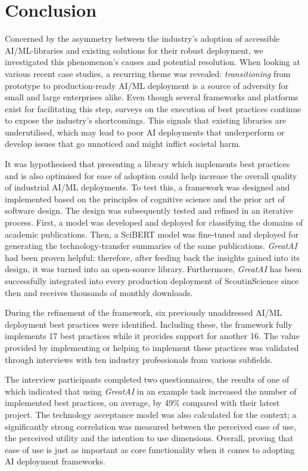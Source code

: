 \chapter{Conclusion} \label{chapter:conclusion}

Concerned by the asymmetry between the industry's adoption of accessible AI/ML-libraries and existing solutions for their robust deployment, we investigated this phenomenon's causes and potential resolution. When looking at various recent case studies, a recurring theme was revealed: \textit{transitioning} from prototype to production-ready AI/ML deployment is a source of adversity for small and large enterprises alike. Even though several frameworks and platforms exist for facilitating this step, surveys on the execution of best practices continue to expose the industry's shortcomings. This signals that existing libraries are underutilised, which may lead to poor AI deployments that underperform or develop issues that go unnoticed and might inflict societal harm.

It was hypothesised that presenting a library which implements best practices and is also optimised for ease of adoption could help increase the overall quality of industrial AI/ML deployments. To test this, a framework was designed and implemented based on the principles of cognitive science and the prior art of software design. The design was subsequently tested and refined in an iterative process. First, a model was developed and deployed for classifying the domains of academic publications. Then, a SciBERT model was fine-tuned and deployed for generating the technology-transfer summaries of the same publications. \textit{GreatAI} had been proven helpful; therefore, after feeding back the insights gained into its design, it was turned into an open-source library. Furthermore, \textit{GreatAI} has been successfully integrated into every production deployment of ScoutinScience since then and receives thousands of monthly downloads.

During the refinement of the framework, six previously unaddressed AI/ML deployment best practices were identified. Including these, the framework fully implements 17 best practices while it provides support for another 16. The value provided by implementing or helping to implement these practices was validated through interviews with ten industry professionals from various subfields.

The interview participants completed two questionnaires, the results of one of which indicated that using \textit{GreatAI} in an example task increased the number of implemented best practices, on average, by 49\% compared with their latest project. The technology acceptance model was also calculated for the context; a significantly strong correlation was measured between the perceived ease of use, the perceived utility and the intention to use dimensions. Overall, proving that ease of use is just as important as core functionality when it comes to adopting AI deployment frameworks.

